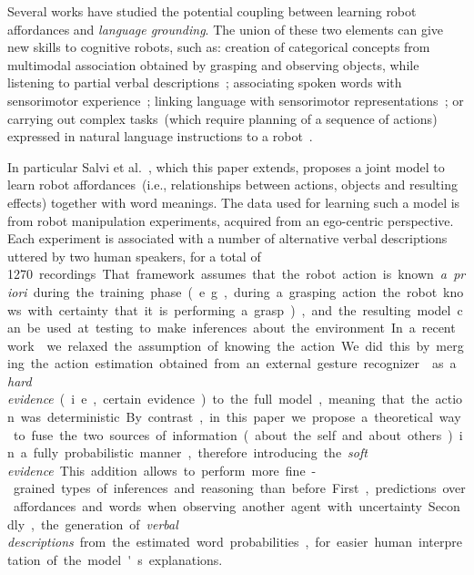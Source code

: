 Several works have studied the potential coupling between learning robot affordances and \emph{language grounding}.
The union of these two elements can give new skills to cognitive robots, such as:
creation of categorical concepts from multimodal association obtained by grasping and observing objects, while listening to partial verbal descriptions~\cite{nakamura:2009:iros,araki:2012:iros};
associating spoken words with sensorimotor experience~\cite{salvi:2012:smcb,morse:2016:cogsci};
linking language with sensorimotor representations~\cite{stramandinoli:2016:icdl}; or
carrying out complex tasks~(which require planning of a sequence of actions) expressed in natural language instructions to a robot~\cite{antunes:2016:icra}.

In particular Salvi et al.~\cite{salvi:2012:smcb}, which this paper extends, proposes a joint model to learn robot affordances~(i.e., relationships between actions, objects and resulting effects) together with word meanings.
The data used for learning such a model is from robot manipulation experiments, acquired from an ego-centric perspective.
Each experiment is associated with a number of alternative verbal descriptions uttered by two human speakers, for a total of \SI{1270}~recordings.
That framework assumes that the robot action is known \emph{a~priori} during the training phase~(e.g., during a grasping action the robot knows with certainty that it is performing a grasp), and the resulting model can be used at testing to make inferences about the environment.
In a recent work~\cite{saponaro:2017:glu} we relaxed the assumption of knowing the action.
We did this by merging the action estimation obtained from an external gesture recognizer~\cite{saponaro:2013:crhri} as a \emph{hard evidence}~(i.e., certain evidence) to the full model, meaning that the action was deterministic.
By contrast, in this paper we propose a theoretical way to fuse the two sources of information~(about the self and about others) in a fully probabilistic manner, therefore introducing the \emph{soft evidence}.
This addition allows to perform more fine-grained types of inferences and reasoning than before.
First, predictions over affordances and words when observing another agent with uncertainty.
Secondly, the generation of \emph{verbal descriptions} from the estimated word probabilities, for easier human interpretation of the model's explanations.
